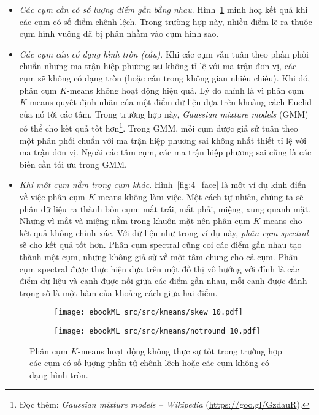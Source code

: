 \begin{itemize}
\item \textit{Các cụm cần có số lượng điểm gần bằng nhau}.
Hình~\ref{fig:4_disa} minh hoạ kết quả khi các cụm có số điểm
chênh lệch. Trong trường hợp này, nhiều điểm lẽ ra thuộc cụm hình vuông đã bị phân nhầm vào cụm hình sao.

\item \textit{Các cụm cần có dạng hình tròn (cầu)}.
Khi các cụm vẫn tuân theo phân phối chuẩn nhưng ma trận hiệp phương sai
không tỉ lệ với ma trận đơn vị, các cụm sẽ không có dạng tròn
(hoặc cầu trong không gian nhiều chiều). Khi đó, phân cụm $K$-means không hoạt động hiệu quả. Lý do chính là vì phân cụm $K$-means quyết định
nhãn của một điểm dữ liệu dựa trên khoảng cách Euclid của nó tới các
tâm. Trong trường hợp này, \textit{Gaussian mixture models} (GMM)~\cite{reynolds2015gaussian} có thể cho kết quả tốt hơn\footnote{Đọc thêm:
\textit{Gaussian mixture models -- Wikipedia} (\url{https://goo.gl/GzdauR}).}. Trong GMM, mỗi cụm được giả sử tuân theo một phân phối chuẩn với ma trận hiệp phương sai không nhất thiết tỉ lệ với ma trận đơn vị. Ngoài các tâm cụm, các ma trận hiệp phương sai cũng là các biến cần tối ưu trong GMM.


\item \textit{Khi một cụm nằm trong cụm khác}.
Hình~\ref{fig:4_face} là một ví dụ kinh điển về việc phân cụm $K$-means
không làm việc. Một cách tự nhiên, chúng ta sẽ phân dữ liệu ra thành bốn
cụm: mắt trái, mắt phải, miệng, xung quanh mặt. Nhưng vì mắt và miệng nằm
trong khuôn mặt nên phân cụm $K$-means cho kết quả không chính xác. Với dữ
liệu như trong ví dụ này, \textit{phân cụm
spectral}~\cite{von2007tutorial,ng2002spectral} sẽ cho kết quả tốt hơn. Phân
cụm spectral cũng coi các điểm gần nhau tạo thành một cụm, nhưng không giả
sử về một tâm chung cho cả cụm. Phân cụm spectral được thực hiện dựa trên
một đồ thị vô hướng với đỉnh là các điểm dữ liệu và cạnh được nối giữa các
điểm gần nhau, mỗi cạnh được đánh trọng số là một hàm của khoảng cách giữa
hai điểm.


\end{itemize}


\begin{figure}[ht]
\begin{subfigure}{0.49\textwidth}

\texttt{[image: ebookML\_src/src/kmeans/skew\_10.pdf]}
\caption{}
\label{fig:4_disa}
\end{subfigure}
\begin{subfigure}{0.49\textwidth}

\texttt{[image: ebookML\_src/src/kmeans/notround\_10.pdf]}
\caption{}
\label{fig:4_disb}
\end{subfigure}
\caption{
Phân cụm $K$-means hoạt động không thực sự tốt trong trường hợp các
cụm có số lượng phần tử chênh lệch hoặc các cụm không có dạng
hình tròn.
}
\label{fig:4_dis}
\end{figure}



